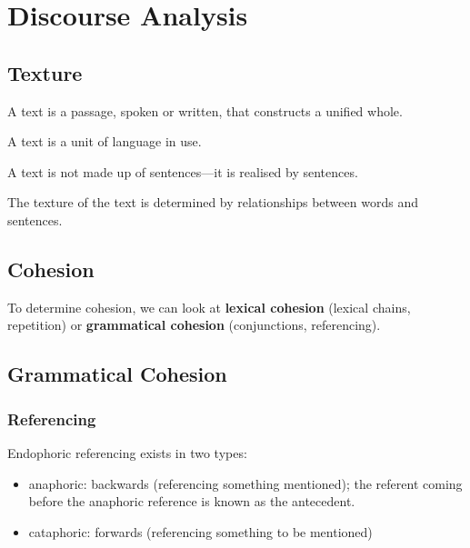 \documentclass[../main.tex]{subfiles}
\begin{document}
\chapter{Discourse Analysis}

    \section{Texture}
    A text is a passage, spoken or written, that constructs a unified whole. 
    
    A text is a unit of language in use.
    
    A text is not made up of sentences---it is realised by sentences.
    
    
    The texture of the text is determined by relationships between words and sentences.

    \section{Cohesion}

    To determine cohesion, we can look at \textbf{lexical cohesion} (lexical chains, repetition) or \textbf{grammatical cohesion} (conjunctions, referencing).

    \section{Grammatical Cohesion}
        \subsection{Referencing}
        Endophoric referencing exists in two types:\begin{itemize}
            \item anaphoric: backwards (referencing something mentioned); the referent coming before the anaphoric reference is known as the antecedent.
            \item cataphoric: forwards (referencing something to be mentioned)
        \end{itemize}
\end{document}
